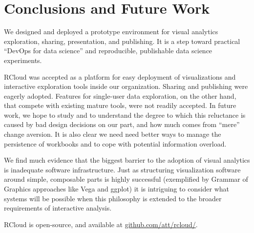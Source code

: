 \section{Conclusions and Future Work}
We designed and deployed a prototype environment for visual analytics
exploration, sharing, presentation, and publishing. It is a step toward
practical ``DevOps for data science'' and reproducible, publishable data
science experiments.

RCloud was accepted as a platform for easy deployment of visualizations
and interactive exploration tools inside our organization.  
Sharing and publishing were eagerly adopted.
Features for single-user data exploration, on the other hand, that
compete with existing mature tools, were not readily accepted.
In future work, we hope to study and to understand the degree to which
this reluctance is caused by bad design decisions on our part, and how
much comes from ``mere'' change aversion. It is also clear we need
need better ways to manage the persistence of workbooks and to cope
with potential information overload.

We find much evidence that the biggest barrier to the adoption of
visual analytics is inadequate software infrastructure.
Just as structuring visualization software around simple,
composable parts is highly successful (exemplified by
Grammar of Graphics approaches like Vega and ggplot)
it is intriguing to consider what systems will be
possible when this philosophy is extended to the
broader requirements of interactive analysis.

RCloud is open-source, and available at \url{github.com/att/rcloud/}.
